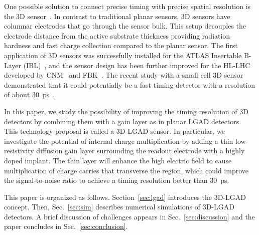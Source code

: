 \documentclass[aps,pt14,superscriptaddress,floatfix,nofootinbib]{revtex4}
\begin{document}
One possible solution to connect precise timing with precise spatial resolution is the 3D sensor~\cite{Parker:1996dx}.   In contrast to traditional planar sensors, 3D sensors have columnar electrodes that go through the sensor bulk.  This setup decouples the electrode distance from the active substrate thickness providing radiation hardness and fast charge collection compared to the planar sensor.  The first application of 3D sensors was successfully installed for the ATLAS Insertable B-Layer (IBL)~\cite{Abbott:2018ikt}, and the sensor design has been further improved for the HL-LHC developed by CNM~\cite{Pellegrini:2008zza} and FBK~\cite{Sultan:2016vzg}. The recent study with a small cell 3D sensor demonstrated that it could potentially be a fast timing detector with a resolution of about 30~ps~\cite{Kramberger:2019ygz}.


In this paper, we study the possibility of improving the timing resolution of 3D detectors by combining them with a gain layer as in planar LGAD detectors.  This technology proposal is called a 3D-LGAD sensor.  In particular, we investigate the potential of internal charge multiplication by adding a thin low-resistivity diffusion gain layer surrounding the readout electrode with a highly doped implant. The thin layer will enhance the high electric field to cause multiplication of charge carries that transverse the region, which could improve the signal-to-noise ratio to achieve a timing resolution better than 30~ps.  %

This paper is organized as follows.  Section~\ref{sec:lgad} introduces the 3D-LGAD concept.  Then, Sec.~\ref{sec:sim} describes numerical simulations of 3D-LGAD detectors.  A brief discussion of challenges appears in Sec.~\ref{sec:discussion} and the paper concludes in Sec.~\ref{sec:conclusion}.
\end{document}
